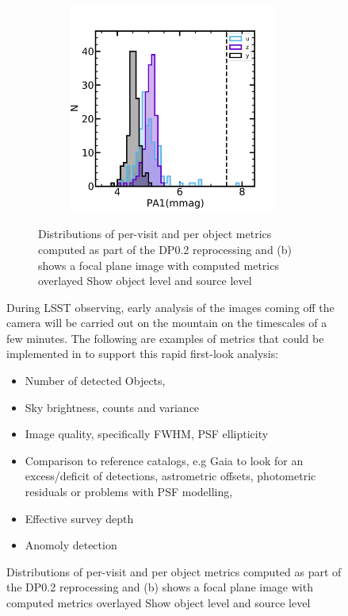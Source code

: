 \begin{figure}[!ht]
\begin{figure}[!htp]
\begin{subfigure}{.5\textwidth}
\end{subfigure}%
\begin{subfigure}{.5\textwidth}
    \includegraphics[width=0.98\textwidth]{figures/dp02_pa1_alltracts_uzy}
\end{subfigure}
\par\medskip %
\caption[short]{Distributions of per-visit and per object metrics computed as part of the DP0.2 reprocessing and (b) shows a focal plane image with computed metrics overlayed Show object level and source level }
\label{fig:faro_dp02_distr}
\end{figure}

During LSST observing, early analysis of the images coming off the camera will be carried out on the mountain on the timescales of a few minutes. 
The following are examples of metrics that could be implemented in \faro to support this rapid first-look analysis:
\begin{itemize}
\item Number of detected Objects,
\item Sky brightness, counts and variance 
\item Image quality, specifically FWHM, PSF ellipticity
\item Comparison to reference catalogs, e.g Gaia to look for an excess/deficit of detections, astrometric offsets, photometric residuals or problems with PSF modelling,
\item Effective survey depth
\item Anomoly detection
\end{itemize}


\end{figure}
